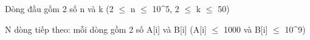 Dòng đầu gồm 2 số n và k (2 $\le$  n  $\le$  10^5, 2  $\le$  k  $\le$  50)   



    N dòng tiếp theo: mỗi dòng gồm 2 số A[i] và B[i] (A[i]  $\le$  1000 và B[i]  $\le$  10^9)